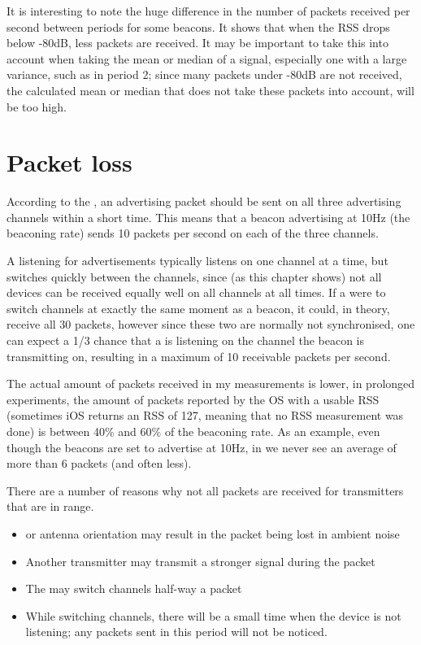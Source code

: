 It is interesting to note the huge difference in the number of packets received per second between periods for some beacons.
It shows that when the RSS drops below -80dB, less packets are received.
It may be important to take this into account when taking the mean or median of a signal, especially one with a large variance, such as in period 2; since many packets under -80dB are not received, the calculated mean or median that does not take these packets into account, will be too high.

\section{Packet loss}
\label{sec:rss-packet-loss}
According to the \BTspec, an advertising packet should be sent on all three advertising channels within a short time.
This means that a beacon advertising at 10Hz (the beaconing rate) sends 10 packets per second on each of the three channels.

A \device listening for advertisements typically listens on one channel at a time, but switches quickly between the channels, since (as this chapter shows) not all devices can be received equally well on all channels at all times.
If a \device were to switch channels at exactly the same moment as a beacon, it could, in theory, receive all 30 packets, however since these two are normally not synchronised, one can expect a 1/3 chance that a \device is listening on the channel the beacon is transmitting on, resulting in a maximum of 10 receivable packets per second.

The actual amount of packets received in my measurements is lower, in prolonged experiments, the amount of packets reported by the OS with a usable RSS (sometimes iOS returns an RSS of 127, meaning that no RSS measurement was done) is between 40\% and 60\% of the beaconing rate.
As an example, even though the beacons are set to advertise at 10Hz, in  we never see an average of more than 6 packets (and often less).

There are a number of reasons why not all packets are received for transmitters that are in range.
\begin{itemize}
    \item \Mpi or antenna orientation may result in the packet being lost in ambient noise
    \item Another transmitter may transmit a stronger signal during the packet
    \item The \device may switch channels half-way a packet
    \item While switching channels, there will be a small time when the device is not listening; any packets sent in this period will not be noticed.
\end{itemize}

